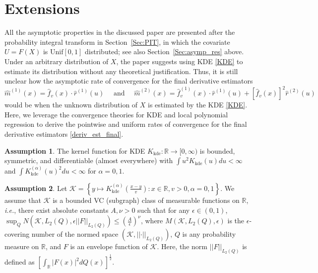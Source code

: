 \documentclass{uwstat572}
\theoremstyle{definition}
\newtheorem{assump}{Assumption}
\newcommand{\norm}[1]{\left|\left| #1 \right|\right|}
\renewcommand{\hat}{\widehat}
\theoremstyle{theorem}
\begin{document}
\section{Extensions}
\label{Sec:extension}

All the asymptotic properties in the discussed paper \citep{liu2020smoothed} are presented after the probability integral transform in Section~\ref{Sec:PIT}, in which the covariate $U=F(X)$ is $\mathrm{Unif}[0,1]$ distributed; see also Section~\ref{Sec:asymp_res} above. Under an arbitrary distribution of $X$, the paper suggests using KDE \eqref{KDE} to estimate its distribution without any theoretical justification. Thus, it is still unclear how the asymptotic rate of convergence for the final derivative estimators
\begin{equation}
\label{deriv_est_final}
\hat{m}^{(1)}(x) = \hat{f}_v(x) \cdot \hat{r}^{(1)}(u) \quad \text{ and }\quad \hat{m}^{(2)}(x) = \hat{f}_v^{(1)}(x) \cdot \hat{r}^{(1)}(u) + \left[\hat{f}_v(x)\right]^2 \hat{r}^{(2)}(u)
\end{equation} 
would be when the unknown distribution of $X$ is estimated by the KDE \eqref{KDE}. Here, we leverage the convergence theories for KDE \citep{gine2002rates,Einmahl2005uniform,chacon2011asymptotics} and local polynomial regression \citep{francisco2003uniform} to derive the pointwise and uniform rates of convergence for the final derivative estimators \eqref{deriv_est_final}. 
\begin{assump}
\label{assump:kernel_KDE}
The kernel function for KDE $K_{\text{kde}}:\mathbb{R}\to [0,\infty)$ is bounded, symmetric, and differentiable (almost everywhere) with $\int u^2 K_{\text{kde}}(u) du<\infty$ and $\int K_{\text{kde}}^{(\alpha)}(u)^2 du < \infty$ for $\alpha=0,1$.
\end{assump}
\begin{assump}
\label{assump:kernel_VC}
Let $\mathcal{K} = \left\{y\mapsto K_{\text{kde}}^{(\alpha)}\left(\frac{x-y}{v}\right): x\in \mathbb{R}, v>0, \alpha=0,1 \right\}$. We assume that $\mathcal{K}$ is a bounded VC (subgraph) class of measurable functions on $\mathbb{R}$, \emph{i.e.}, there exist absolute constants $A,\nu >0$ such that for any $\epsilon\in (0,1)$, 
$\sup_Q N\left(\mathcal{K}, L_2(Q), \epsilon\norm{F}_{L_2(Q)}\right) \leq \left(\frac{A}{\epsilon}\right)^{\nu}$, where $M\left(\mathcal{K}, L_2(Q), \epsilon\right)$ is the $\epsilon$-covering number of the normed space $\left(\mathcal{K}, \norm{\cdot}_{L_2(Q)}\right)$, $Q$ is any probability measure on $\mathbb{R}$, and $F$ is an envelope function of $\mathcal{K}$. Here, the norm $\norm{F}_{L_2(Q)}$ is defined as $\left[\int_{\mathbb{R}} |F(x)|^2 dQ(x)\right]^{\frac{1}{2}}$.
\end{assump}
\end{document}
